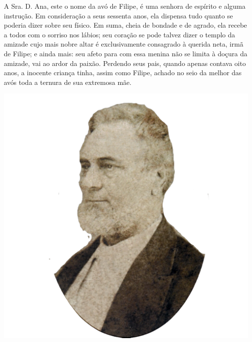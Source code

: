 \begin{myquote}


\begin{minipage}{0.6\textwidth}
A Sra. D. Ana, este o nome da avó de Filipe, é uma senhora de espírito e
alguma instrução. Em consideração a seus sessenta anos, ela dispensa tudo
quanto se poderia dizer sobre seu físico. Em suma, cheia de bondade e de
agrado, ela recebe a todos com o sorriso nos lábios; seu coração se pode
talvez dizer o templo da amizade cujo mais nobre altar é exclusivamente
consagrado à querida neta, irmã de Filipe; e ainda mais: seu afeto para com
essa menina não se limita à doçura da amizade, vai ao ardor da paixão.
Perdendo seus pais, quando apenas contava oito anos, a inocente criança tinha,
assim como Filipe, achado no seio da melhor das avós toda a ternura de sua
extremosa mãe.
\end{minipage}
\hfill
\begin{minipage}{0.5\textwidth}
  \centering
  \includegraphics[width=\textwidth]{./imgSAEB_7_POR/media/image56.png}
\end{minipage}


\end{myquote}

